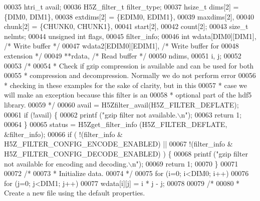 \begin{DoxyCode}
00035     htri\_t          avail;
00036     H5Z\_filter\_t    filter\_type;
00037     hsize\_t         dims[2] = \{DIM0, DIM1\},
00038                     extdims[2] = \{EDIM0, EDIM1\},
00039                     maxdims[2],
00040                     chunk[2] = \{CHUNK0, CHUNK1\},
00041                     start[2],
00042                     count[2];
00043     \textcolor{keywordtype}{size\_t}          nelmts;
00044     \textcolor{keywordtype}{unsigned} \textcolor{keywordtype}{int}    flags,
00045                     filter\_info;
00046     \textcolor{keywordtype}{int}             wdata[DIM0][DIM1],          \textcolor{comment}{/* Write buffer */}
00047                     wdata2[EDIM0][EDIM1],       \textcolor{comment}{/* Write buffer for}
00048 \textcolor{comment}{                                                   extension */}
00049                     **rdata,                    \textcolor{comment}{/* Read buffer */}
00050                     ndims,
00051                     i, j;
00052 
00053     \textcolor{comment}{/*}
00054 \textcolor{comment}{     * Check if gzip compression is available and can be used for both}
00055 \textcolor{comment}{     * compression and decompression.  Normally we do not perform error}
00056 \textcolor{comment}{     * checking in these examples for the sake of clarity, but in this}
00057 \textcolor{comment}{     * case we will make an exception because this filter is an}
00058 \textcolor{comment}{     * optional part of the hdf5 library.}
00059 \textcolor{comment}{     */}
00060     avail = H5Zfilter\_avail(H5Z\_FILTER\_DEFLATE);
00061     \textcolor{keywordflow}{if} (!avail) \{
00062         printf (\textcolor{stringliteral}{"gzip filter not available.\(\backslash\)n"});
00063         \textcolor{keywordflow}{return} 1;
00064     \}
00065     status = H5Zget\_filter\_info (H5Z\_FILTER\_DEFLATE, &filter\_info);
00066     \textcolor{keywordflow}{if} ( !(filter\_info & H5Z\_FILTER\_CONFIG\_ENCODE\_ENABLED) ||
00067                 !(filter\_info & H5Z\_FILTER\_CONFIG\_DECODE\_ENABLED) ) \{
00068         printf (\textcolor{stringliteral}{"gzip filter not available for encoding and decoding.\(\backslash\)n"});
00069         \textcolor{keywordflow}{return} 1;
00070     \}
00071 
00072     \textcolor{comment}{/*}
00073 \textcolor{comment}{     * Initialize data.}
00074 \textcolor{comment}{     */}
00075     \textcolor{keywordflow}{for} (i=0; i<DIM0; i++)
00076         \textcolor{keywordflow}{for} (j=0; j<DIM1; j++)
00077             wdata[i][j] = i * j - j;
00078 
00079     \textcolor{comment}{/*}
00080 \textcolor{comment}{     * Create a new file using the default properties.}

\end{DoxyCode}
